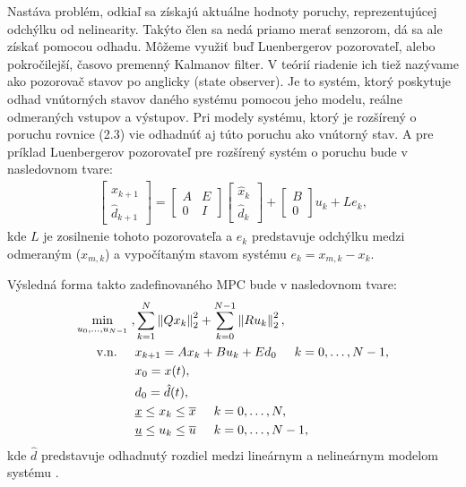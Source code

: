 Nastáva problém, odkiaľ sa získajú aktuálne hodnoty poruchy, reprezentujúcej odchýlku od nelinearity. Takýto člen sa nedá priamo merať senzorom, dá sa ale získať pomocou odhadu. Môžeme využiť buď Luenbergerov pozorovateľ, alebo pokročilejší, časovo premenný Kalmanov filter. V teórií riadenie ich tiež nazývame ako pozorovač stavov po anglicky (state observer). Je to systém, ktorý poskytuje odhad vnútorných stavov daného systému pomocou jeho modelu, reálne odmeraných vstupov a výstupov. Pri modely systému, ktorý je rozšírený o poruchu rovnice (2.3) vie odhadnúť aj túto poruchu ako vnútorný stav. A pre príklad Luenbergerov pozorovateľ pre rozšírený systém o poruchu bude v nasledovnom tvare:
\begin{align}
	\begin{bmatrix}
		\hat{x}_{k+1}\\
		\hat{d}_{k+1}
	\end{bmatrix} = 
	\begin{bmatrix}
		A&E\\
		0&I
	\end{bmatrix}
	\begin{bmatrix}
		\hat{x}_{k}\\
		\hat{d}_{k}
	\end{bmatrix}+
	\begin{bmatrix}
		B\\
		0
	\end{bmatrix}u_{k} + Le_{k},
\end{align}
kde $L$ je zosilnenie tohoto pozorovateľa a $e_{k}$ predstavuje odchýlku medzi odmeraným ($x_{m,k}$) a vypočítaným stavom systému $e_{k}= x_{m,k}-x_{k}$.

Výsledná forma takto zadefinovaného MPC bude v nasledovnom tvare:
\begin{subequations}
	\begin{align}
	\displaystyle \min_{u_0,...,u_{N-1}} \hspace{0.1cm}, & 
	\sum_{k=1}^{N}\left\lVert Qx_k\right\rVert^{2}_{2}+\sum_{k=0}^{N-1}\left\lVert Ru_k\right\rVert^{2}_{2},\\
	\textrm{v.n.} \hspace{0.5cm} & x_{k+1} = Ax_{k} + Bu_{k} + Ed_{0}\hspace{0.5cm} k=0,\dots,N-1,\\
	& x_{0} = x(t),\\
	& d_{0} = \hat{d}(t),\\
	& \underline{x} \leq x_{k} \leq \overline{x}\hspace{0.5cm} k=0,\dots,N,\\
	& \underline{u} \leq u_{k} \leq \overline{u}\hspace{0.5cm} k=0,\dots,N-1,
	\end{align}
\end{subequations}
kde $\hat{d}$ predstavuje odhadnutý rozdiel medzi lineárnym a nelineárnym modelom systému \cite{bib8}.

